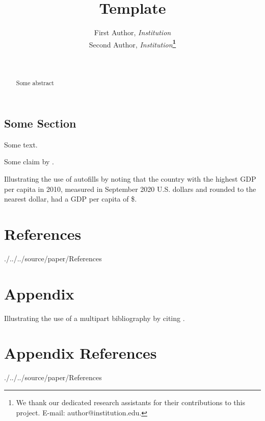 \documentclass[12pt]{article}
\newcommand*{\dir}{.}
\renewcommand*{\dir}{./../..}
\begin{document}
\title{Template}
\author{First Author, \emph{Institution}\\
Second Author, \emph{Institution}\textbf{\thanks{We thank our dedicated research assistants for their contributions
to this project. E-mail: author@institution.edu.}}}
\date{\monthname\ \number\year}
\maketitle
\begin{abstract}
\noindent Some abstract
\end{abstract}
\begin{btUnit}

\begin{spacing}{1.32}

\section{Some Section}

Some text.

Some claim by \citet{gentzkow2010drives}. 

Illustrating the use of autofills by noting that the country with the highest GDP per capita in 2010, measured in September 2020 U.S. dollars and rounded to the nearest dollar, had a GDP per capita of \$\TopGDPValue. 

\end{spacing}

\newpage{}



\newpage{}



\section*{References}

\begin{btSect}[chicago]{\dir/source/paper/References}
\btPrintCited
\end{btSect}

\end{btUnit}

\appendix

\section*{Appendix}

\begin{btUnit}

Illustrating the use of a multipart bibliography by citing \citet{gentzkow2011ideological}.

\section*{Appendix References}

\begin{btSect}[chicago]{\dir/source/paper/References}
\btPrintCited
\end{btSect}

\end{btUnit}
\end{document}
